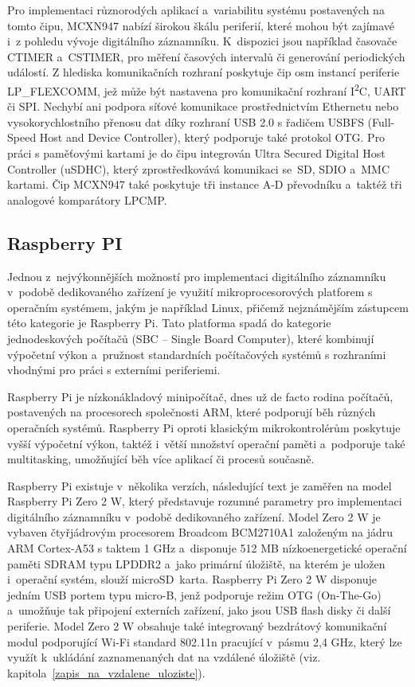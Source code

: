 Pro implementaci různorodých aplikací a~variabilitu systému postavených na tomto čipu, MCXN947 nabízí širokou škálu periferií, které mohou být zajímavé i~z pohledu vývoje digitálního záznamníku. K~dispozici jsou například časovače CTIMER a~CSTIMER, pro měření časových intervalů či generování periodických událostí. Z hlediska komunikačních rozhraní poskytuje čip osm instancí periferie LP\_FLEXCOMM, jež může být nastavena pro komunikační rozhraní I\textsuperscript{2}C, UART či SPI. Nechybí ani podpora síťové komunikace prostřednictvím Ethernetu nebo vysokorychlostního přenosu dat díky rozhraní USB 2.0 s řadičem USBFS (Full-Speed Host and Device Controller), který podporuje také protokol OTG. Pro práci s paměťovými kartami je do čipu integrován Ultra Secured Digital Host Controller (uSDHC), který zprostředkovává komunikaci se~SD, SDIO a~MMC kartami. Čip MCXN947 také poskytuje tři instance A-D převodníku a~taktéž tři analogové komparátory LPCMP.~\cite{nxp_MCX_Nx4x_Reference_Manual}

\subsection{Raspberry PI}
Jednou z~nejvýkonnějších možností pro implementaci digitálního záznamníku v~podobě dedikovaného zařízení je využití mikroprocesorových platforem s operačním systémem, jakým je například Linux, přičemž nejznámějším zástupcem této kategorie je Raspberry Pi. Tato platforma spadá do kategorie jednodeskových počítačů (SBC -- Single Board Computer), které kombinují výpočetní výkon a~pružnost standardních počítačových systémů s rozhraními vhodnými pro práci s externími periferiemi.~\cite{raspberry_pi_pico_2w}

Raspberry Pi je nízkonákladový minipočítač, dnes už de facto rodina počítačů, postavených na procesorech společnosti ARM, které podporují běh různých operačních systémů. Raspberry Pi oproti klasickým mikrokontrolérům poskytuje vyšší výpočetní výkon, taktéž i~větší množství operační paměti a~podporuje také multitasking, umožňující běh více aplikací či procesů současně.~\cite{raspberry_pi_pico_2w}

Raspberry Pi existuje v~několika verzích, následující text je zaměřen na model Raspberry Pi Zero 2 W, který představuje rozumné parametry pro implementaci digitálního záznamníku v~podobě dedikovaného zařízení. Model Zero 2 W je vybaven čtyřjádrovým procesorem Broadcom BCM2710A1 založeným na jádru ARM Cortex-A53 s taktem 1 GHz a~disponuje 512 MB nízkoenergetické operační paměti SDRAM typu LPDDR2 a~jako primární úložiště, na kterém je uložen i~operační systém, slouží microSD~karta. Raspberry Pi Zero 2 W disponuje jedním USB portem typu micro-B, jenž podporuje režim OTG (On-The-Go) a~umožňuje tak připojení externích zařízení, jako jsou USB flash disky či další periferie. Model Zero 2 W obsahuje také integrovaný bezdrátový komunikační modul podporující Wi-Fi standard 802.11n pracující v~pásmu 2,4 GHz, který lze využít k~ukládání zaznamenaných dat na vzdálené úložiště (viz. kapitola~\ref{zapis_na_vzdalene_uloziste}).~\cite{raspberry_pi_pico_2w}

